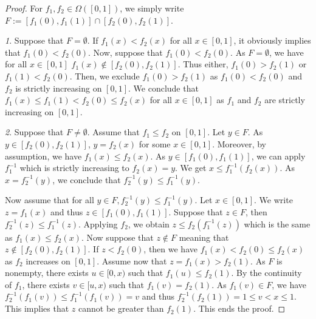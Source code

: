 \documentclass{article}
\def\fset{\Omega([0,1])}
\def\red#1{#1}
\def\blue#1{#1}
\begin{document}
	\begin{proof}
	\blue{For $f_1,f_2\in\fset$, we simply write $F:=[f_1(0),f_1(1)]\cap [f_2(0),f_2(1)]$.}
	
		{\itshape 1}. Suppose that \blue{$F=\emptyset$}. If \blue{$f_1(x) < f_2(x)$} for all $x\in [0,1]$, it obviously implies that \blue{$f_1(0)<f_2(0)$}. Now, suppose that \blue{$f_1(0)<f_2(0)$}. As \blue{$F=\emptyset$}, we have for all $x\in [0,1]$ \blue{$f_1(x)\notin [f_2(0),f_2(1)]$}. Thus either, \blue{$f_1(0)>f_2(1)$} or  \blue{$f_1(1)<f_2(0)$}. Then, we exclude \blue{$f_1(0)>f_2(1)$} as \blue{$f_1(0)<f_2(0)$} and \blue{$f_2$} is strictly increasing on $[0,1]$. We conclude that \blue{$f_1(x) \leq f_1(1)< f_2(0)\leq f_2(x)$} for all $x\in [0,1]$ as \blue{$f_1$ and $f_2$ }are strictly increasing on $[0,1]$.
		
		{\itshape 2}. Suppose that \blue{$F\neq \emptyset$}. Assume that \blue{$f_1\leq f_2$} on $[0,1]$. Let \blue{$y\in F$}. As \blue{$y\in [f_2(0),f_2(1)]$}, \blue{$y=f_2(x)$} for some $x\in [0,1]$. Moreover, by assumption, we have \blue{$f_1(x)\leq f_2(x)$}. As \blue{$y\in [f_1(0),f_1(1)]$}, we can apply \blue{$f_1^{-1}$} which is strictly increasing to $f_2(x)=y$. We get \blue{$x\leq f_1^{-1}(f_2(x))$}. As \blue{$x=f_2^{-1}(y)$}, we conclude that \blue{$f_2^{-1}(y)\leq f_1^{-1}(y)$}. 
		
		Now assume that for all \blue{$y\in F, f_2^{-1}(y)\leq f_1^{-1}(y)$}. Let $x\in [0,1]$. We write \blue{$z=f_1(x)$} and thus \blue{$z\in [f_1(0),f_1(1)]$}. Suppose that \blue{$z\in F$}, then \blue{$f_2^{-1}(z)\leq f_1^{-1}(z)$}. Applying \blue{$f_2$}, we \red{obtain} \blue{$z\leq f_2(f_1^{-1}(z))$} which is the same as \blue{$f_1(x)\leq f_2(x)$}. Now suppose that \blue{$z\notin F$} meaning that \blue{$z\notin [f_2(0),f_2(1)]$}. If \blue{$z<f_2(0)$}, then we have \blue{$f_1(x)<f_2(0)\leq f_2(x)$} as \blue{$f_2$} increases on $[0,1]$. Assume now that \blue{$z=f_1(x)>f_2(1)$}. As \blue{$F$} is nonempty, there exists $u\in [0,x)$ such that \blue{$f_1(u)\leq f_2(1)$}. By \red{the} continuity of \blue{$f_1$}, there exists $v\in [u,x)$ such that \blue{$f_1(v)=f_2(1)$}. As \blue{$f_1(v)\in F$}, we have \blue{$f_2^{-1}(f_1(v))\leq f_1^{-1}(f_1(v))=v$} and thus \blue{$f_2^{-1}(f_2(1))=1\leq v<x\leq 1$}. This implies that $z$ cannot \red{be} greater than \blue{$f_2(1)$}. This ends the proof. 
		

\end{proof}
\end{document}
